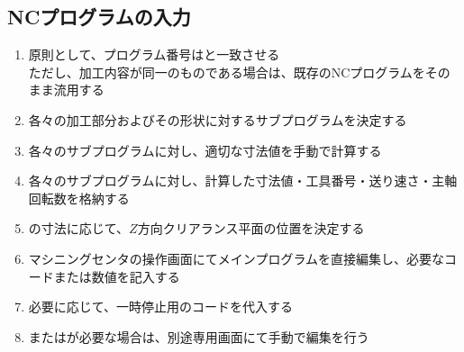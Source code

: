 \subsection{NCプログラムの入力}
\begin{enumerate}[label=\sarrow]
\item 原則として、プログラム番号は\DrawingExists と一致させる\\
ただし、加工内容が同一のものである場合は、既存のNCプログラムをそのまま流用する
\item 各々の加工部分およびその形状に対するサブプログラムを決定する
\item 各々のサブプログラムに対し、適切な寸法値を手動で計算する
\item 各々のサブプログラムに対し、計算した寸法値・工具番号・送り速さ・主軸回転数を格納する
\item \ReAlocationLength の寸法に応じて、$Z$方向クリアランス平面の位置を決定する
\item マシニングセンタの操作画面にてメインプログラムを直接編集し、必要なコードまたは数値を記入する
\item 必要に応じて、一時停止用のコードを代入する
\item \TDCorrection または\TLCorrection が必要な場合は、別途専用画面にて手動で編集を行う
\end{enumerate}


